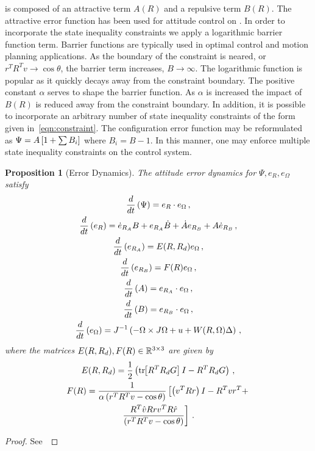 \documentclass[letterpaper, 10 pt, conference]{ieeeconf}  %
\newtheorem{prop}{Proposition}
\begin{document}
 is composed of an attractive term \( A (R) \) and a repulsive term \( B(R) \).
The attractive error function has been used for attitude control on \SO.
In order to incorporate the state inequality constraints we apply a logarithmic barrier function term.
Barrier functions are typically used in optimal control and motion planning applications.
As the boundary of the constraint is neared, or \( r^T R^T v \to \cos \theta \), the barrier term increases, \( B \to \infty\).
The logarithmic function is popular as it quickly decays away from the constraint boundary.
The positive constant \( \alpha \) serves to shape the barrier function.
As \( \alpha \) is increased the impact of \( B(R) \) is reduced away from the constraint boundary. 
In addition, it is possible to incorporate an arbitrary number of state inequality constraints of the form given in~\cref{eqn:constraint}.
The configuration error function may be reformulated as \( \Psi = A \left[ 1 + \sum B_i \right] \) where \( B_i = B - 1 \).
In this manner, one may enforce multiple state inequality constraints on the control system.
\begin{prop}[Error Dynamics]\label{prop:error_dyn}
	The attitude error dynamics for \( \Psi, e_R, e_\Omega \) satisfy 
	\begin{gather}
		\frac{d }{d t} \left( \Psi \right) = e_R \cdot e_\Omega \, , \label{eqn:psi_dot}\\
		\frac{d }{d t} \left( e_R \right) = \dot{e}_{R_A} B + e_{R_A} \dot{B} + \dot{A}e_{R_B} + A \dot{e}_{R_B} \, , \label{eqn:eR_dot}\\
		\frac{d }{d t} \left( e_{R_A} \right) = E(R, R_d) e_\Omega \, , \label{eqn:eRA_dot} \\
		\frac{d }{d t} \left( e_{R_B} \right) = F(R) e_\Omega \, , \label{eqn:eRB_dot} \\
		\frac{d }{d t} \left( A \right) = e_{R_A} \cdot e_\Omega \, , \label{eqn:A_dot} \\
		\frac{d }{d t} \left( B \right) = e_{R_B} \cdot e_\Omega \, , \label{eqn:B_dot} \\
		\frac{d }{d t} \left( e_\Omega \right) = J^{-1} \left( -\Omega \times J \Omega + u + W(R, \Omega) \Delta \right) \, , \label{eqn:eW_dot}
	\end{gather}
	where the matrices \(E(R,R_d), F(R) \in \mathbb{R}^{3\times3} \) are given by
	\begin{gather}
		E(R,R_d) = \frac{1}{2} \left( \mathrm{tr}\negthickspace\left[ R^T R_d G \right]I - R^T R_d G \right) \, , \label{eqn:E} \\
		F(R) = \frac{1}{\alpha \left( r^T R^T v - \cos \theta \right)} \left[\left( v^T R r \right) I - R^T v r^T + \right. \nonumber \\
		\left. \frac{R^T \hat{v} R r v^T R \hat{r}}{\left( r^T R^T v - \cos \theta \right)}\right] \, . \label{eqn:F}
	\end{gather}
\end{prop}
\begin{proof}
See~
\end{proof}
\end{document}
